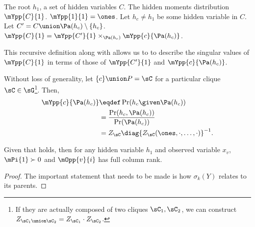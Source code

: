 \begin{algorithm}
  \caption{$\mYpp{C}{1}$}
  \label{algo:Y}
  \begin{algorithmic}
    \REQUIRE The root $h_1$, a set of hidden variables $C$.
    \ENSURE The hidden moments distribution $\mYpp{C}{1}$.
      \STATE $\mYpp{1}{1} = \ones$.
    \ELSE
      \STATE Let $h_c \neq h_1$ be some hidden variable in $C$.
      \STATE Let $C' = C \union \Pa(h_c) \setminus \{h_c\}$.
      \STATE $\mYpp{C}{1} = \mYpp{C'}{1} \times_{\Pa(h_c)} \mYpp{c}{\Pa(h_c)}$.
    \ENDIF
  \end{algorithmic}
\end{algorithm}

This recursive definition along with  allows us to to describe the
singular values of $\mYpp{C}{1}$ in terms of those of $\mYpp{C'}{1}$ and
$\mYpp{c}{\Pa(h_c)}$. 


Without loss of generality, let $\{c\} \union P = \sC$ for
a particular clique $\sC \in \sG$\footnote{If they are actually composed of two
cliques $\sC_1, \sC_2$, we can construct $Z_{\sC_1 \union \sC_2} = Z_{\sC_1} \cdot
Z_{\sC_2}$.}. Then, 
\begin{align*}
\mYpp{c}{\Pa(h_c)} 
  &\eqdef \Pr(h_c \given \Pa(h_c)) \\
  &= \frac{\Pr(h_c, \Pa(h_c))}{\Pr(\Pa(h_c))} \\
  &= Z_\sC \diag{Z_\sC(\ones, \cdot, \ldots, \cdot)}^{-1}.
\end{align*}

\begin{lemma}
  \label{lem:full-rank-suff}
  Given that  holds, then for any hidden
  variable $h_1$ and observed variable $x_v$, $\mPi{1} \succ 0$ and
  $\mOpp{v}{i}$ has full column rank.
\end{lemma}
\begin{proof}
  The important statement that needs to be made is how $\sigma_k(Y)$
  relates to its parents.
\end{proof}

